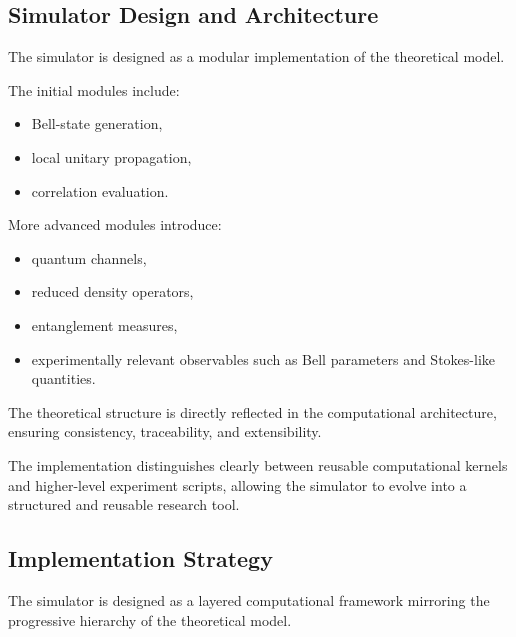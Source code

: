 
\subsection{Simulator Design and Architecture}

The simulator is designed as a modular implementation of the theoretical model.

\medskip

The initial modules include:
\begin{itemize}
\item Bell-state generation,
\item local unitary propagation,
\item correlation evaluation.
\end{itemize}

\medskip

More advanced modules introduce:
\begin{itemize}
\item quantum channels,
\item reduced density operators,
\item entanglement measures,
\item experimentally relevant observables such as Bell parameters and Stokes-like quantities.
\end{itemize}

\medskip

The theoretical structure is directly reflected in the computational architecture, ensuring consistency, traceability, and extensibility.

\medskip

The implementation distinguishes clearly between reusable computational kernels and higher-level experiment scripts, allowing the simulator to evolve into a structured and reusable research tool.


\subsection{Implementation Strategy}

The simulator is designed as a layered computational framework mirroring the progressive hierarchy of the theoretical model.

